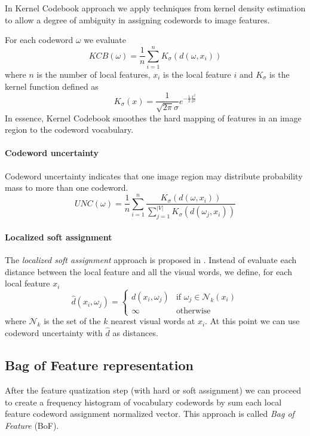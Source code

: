 In Kernel Codebook approach we apply techniques from kernel density estimation to allow a degree of ambiguity in assigning codewords to image features. 

For each codeword $\omega$ we evaluate
\begin{equation}
KCB(\omega) = \frac{1}{n} \sum_{i = 1}^{n} K_{\sigma}(d(\omega, x_i))
\end{equation}
where $n$ is the number of local features, $x_i$ is the local feature $i$ and $K_{\sigma}$ is the kernel function defined as
\begin{equation}
K_{\sigma} (x) = \frac{1}{\sqrt{2\pi} \sigma} e^{- \frac{1}{2} \frac{x^2}{\sigma^2}}
\end{equation}
In essence, Kernel Codebook smoothes the hard mapping of features in an image region to the codeword vocabulary.

\paragraph{Codeword uncertainty}

Codeword uncertainty indicates that one image region may distribute probability mass to more than one codeword.
\begin{equation}
UNC(\omega) = \frac{1}{n} \sum_{i = 1}^{n} \frac{K_{\sigma}(d(\omega, x_i))}{\sum_{j=1}^{|V|} K_{\sigma}(d(\omega_j, x_i))}
\end{equation}

\paragraph{Localized soft assignment}

The \emph{localized soft assignment} approach is proposed in \cite{LingqiaoLiu:2011:DSC:2355573.2356438}. Instead of evaluate each distance between the local feature and all the visual words, we define, for each local feature $x_i$
\begin{equation}
\hat{d}(x_i, \omega_j) =
\left\{
\begin{array}{ll}
d(x_i, \omega_j) & \mbox{if } \omega_j \in \mathcal{N}_k(x_i) \\
\infty & \mbox{otherwise}
\end{array}
\right.
\end{equation}
where $\mathcal{N}_k$ is the set of the $k$ nearest visual words at $x_i$. At this point we can use codeword uncertainty with $\hat{d}$ as distances.

\subsection{Bag of Feature representation}

After the feature quatization step (with hard or soft assignment) we can proceed to create a frequency histogram of vocabulary codewords by sum each local feature codeword assignment normalized vector. This approach is called \emph{Bag of Feature} (BoF).





